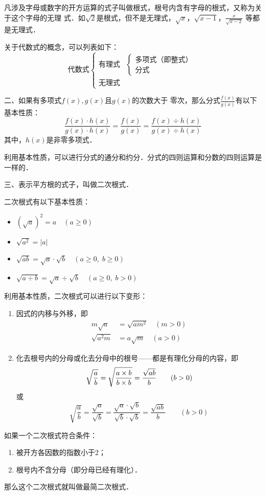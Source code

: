凡涉及字母或数字的开方运算的式子叫做根式，根号内含有字母的根式，又称为关于这个字母的无理
式．如$\sqrt{2}$是根式，但不是无理式，$\sqrt{x}$，$\sqrt{x-1}$，$\frac{x}{\sqrt{x-2}}$
等都是无理式．

关于代数式的概念，可以列表如下：
\[
\text{代数式}\begin{cases}
    \text{有理式} & \begin{cases}
        \text{多项式（即整式）}\\\text{分式}
    \end{cases}\\
    \text{无理式}
\end{cases}    
\]

二、如果有多项式$f(x),g(x)$且$g(x)$的次数大于
零次，那么分式$\frac{f (x)}{g (x)}$有以下基本性质：
\[\frac{f (x) \cdot h (x)}{g(x)\cdot h(x)}=\frac{f(x)}{g (x)}=\frac{f (x) \div h (x)}{g(x)\div h(x)}\]
其中，$h(x)$是非零多项式．

利用基本性质，可以进行分式的通分和约分．分式的四则运算和分数的四则运算是一样的．

三、表示平方根的式子，叫做二次根式．

二次根式有以下基本性质：
\begin{itemize}
    \item $\left(\sqrt{a}\right)^2=a\quad (a\ge 0)$
    \item $\sqrt{a^2}=|a|$
    \item $\sqrt{ab}=\sqrt{a}\cdot \sqrt{b}\quad (a\ge 0,\; b\ge 0)$
    \item $\sqrt{a\div b}=\sqrt{a}\div \sqrt{b} \quad (a\ge 0,\; b>0)$
\end{itemize}

利用基本性质，二次根式可以进行以下变形：
\begin{enumerate}
    \item 因式的内移与外移，即
    \[\begin{split}
        m\sqrt{a}&=\sqrt{am^2}\quad (m>0)\\
        \sqrt{a^2m}&=a\sqrt{m}\quad (a>0)
    \end{split}\]
    \item 化去根号内的分母或化去分母中的根号——都是有理化分母的内容，即
\[\sqrt{\dfrac{a}{b}}=\sqrt{\dfrac{a\times b}{b\times b}}=\dfrac{\sqrt{ab}}{b}\qquad (b>0)\]
或
\[\sqrt{\frac{a}{b}}=\frac{\sqrt{a}}{\sqrt{b}}=\frac{\sqrt{a}\cdot \sqrt{b}}{\sqrt{b}\cdot \sqrt{b}}=\frac{\sqrt{ab}}{b}\qquad (b>0)\]
\end{enumerate}

如果一个二次根式符合条件：
\begin{enumerate}
    \item 被开方各因数的指数小于2；
    \item 根号内不含分母（即分母已经有理化）．
\end{enumerate}
那么这个二次根式就叫做最简二次根式．

